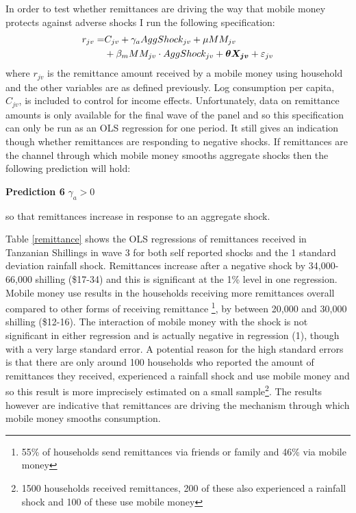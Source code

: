 In order to test whether remittances are driving the way that mobile money protects against adverse shocks I run the following specification: 
\begin{align}
r_{jv}=& C_{jv} + \gamma_a AggShock_{jv} + \mu MM_{jv} \notag \\ 
& + \beta_m MM_{jv}\cdot AggShock_{jv} + \bm{\theta X_{jv}} + \varepsilon_{jv} 
\end{align}
where $r_{jv}$ is the remittance amount received by a mobile money using household and the other variables are as defined previously. Log consumption per capita, $C_{jv}$, is included to control for income effects. Unfortunately, data on remittance amounts is only available for the final wave of the panel and so this specification can only be run as an OLS regression for one period. It still gives an indication though whether remittances are responding to negative shocks. If remittances are the channel through which mobile money smooths aggregate shocks then the following prediction will hold:
\begin{description}
\item{\bf{Prediction 6}} $\gamma_a>0$
\end{description}
so that remittances increase in response to an aggregate shock. 

Table \ref{remittance} shows the OLS regressions of remittances received in Tanzanian Shillings in wave 3 for both self reported shocks and the 1 standard deviation rainfall shock. Remittances increase after a negative shock by 34,000-66,000 shilling (\$17-34) and this is significant at the 1\% level in one regression. Mobile money use results in the households receiving more remittances overall compared to other forms of receiving remittance \footnote{55\% of households send remittances via friends or family and 46\% via mobile money}, by between 20,000 and 30,000 shilling (\$12-16). The interaction of mobile money with the shock is not significant in either regression and is actually  negative in regression (1), though with a very large standard error. A potential reason for the high standard errors is that there are only around 100 households who reported the amount of remittances they received, experienced a rainfall shock and use mobile money  and so this result is more imprecisely estimated on a small sample\footnote{1500 households received remittances, 200 of these also experienced a rainfall shock and 100 of these use mobile money}. The results however are indicative that remittances are driving the mechanism through which mobile money smooths consumption. 



